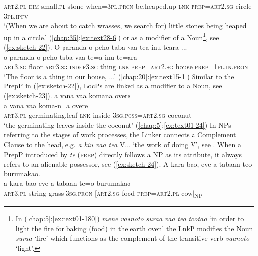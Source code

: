\documentclass[output=paper]{langscibook}
\begin{document}
     \textsc{art}2.\textsc{pl}	\textsc{dim}	small.\textsc{pl}	stone	when=3\textsc{pl}.\textsc{pron}	be.heaped.up	\textsc{lnk}	\textsc{prep}=\textsc{art}2.\textsc{sg}	circle	3\textsc{pl}.\textsc{ipfv}\\
\glt `(When we are about to catch wrasses, we search for) little stones being heaped up in a circle.' (\ref{chap:35}:\ref{ex:text28-6})
\z
or as a modifier of a Noun\footnote{In (\ref{chap:5}:\ref{ex:text01-180}) \textit{mene} \textit{vaanoto} \textit{suraa} \textit{vaa} \textit{tea} \textit{taotao} `in order to light the fire for baking (food) in the earth oven' the LnkP modifies the Noun \textit{suraa} `fire' which functions as the complement of the transitive verb \textit{vaanoto} `light'.}, see (\ref{ex:sketch-22}).
\ea\label{ex:sketch-22}
    O paranda o peho taba vaa tea inu teara ...\\
    \gll o	paranda	o	peho	taba	vaa	te=a	inu	te=ara\\
    \textsc{art}3.\textsc{sg}	floor	\textsc{art}3.\textsc{sg}	\textsc{indef}3.\textsc{sg}	thing	\textsc{lnk}	\textsc{prep}=\textsc{art}2.\textsc{sg}	house	\textsc{prep}=1\textsc{pl}.\textsc{in}.\textsc{pron}\\
    \glt `The floor is a thing in our house, ...' (\ref{chap:20}:\ref{ex:text15-1})
\z
Similar to the PrepP in (\ref{ex:sketch-22}), LocPs are linked as a modifier to a Noun, see (\ref{ex:sketch-23}).
\ea\label{ex:sketch-23}
    a vana vaa komana overe\\
    \gll a	vana	vaa	koma-n=a	overe\\
    \textsc{art}3.\textsc{pl}	germinating.leaf	\textsc{lnk}	inside-3\textsc{sg}.\textsc{poss}=\textsc{art}2.\textsc{sg}	coconut\\
    \glt `the germinating leaves inside the coconut' (\ref{chap:5}:\ref{ex:text01-24})
\z
In NPs referring to the stages of work processes, the Linker connects a Complement Clause to the head, e.g. \textit{a kiu vaa tea} V... `the work of doing V', see .
When a PrepP introduced by \textit{te} (\textsc{prep}) directly follows a NP as its attribute, it always refers to an alienable possessor, see (\ref{ex:sketch-24}).
\ea\label{ex:sketch-24}
    A kara bao, eve a tabaan teo burumakao.\\
    \gll a	kara	bao	eve	a	tabaan	te=o	burumakao\\
    \textsc{art}3.\textsc{pl}	string	grass	3\textsc{sg}.\textsc{pron}	[\textsc{art}2.\textsc{sg}	food	\textsc{prep}=\textsc{art}2.\textsc{pl}	cow]\textsubscript{NP}\\
\end{document}

